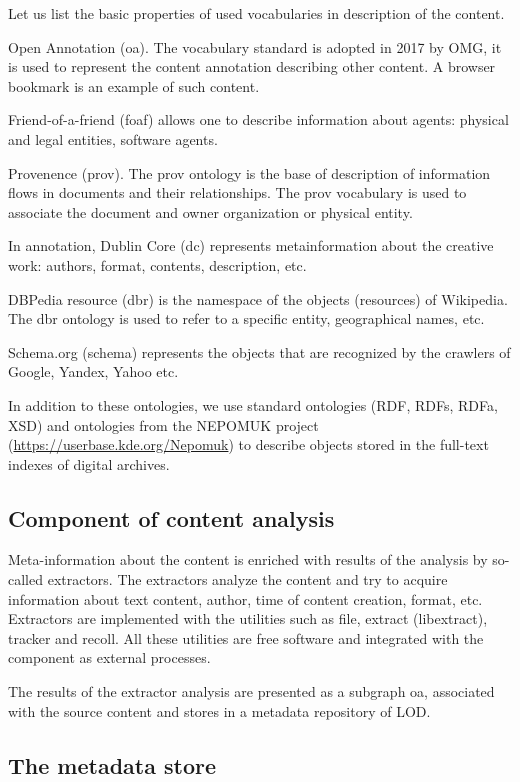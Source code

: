 \documentclass[12pt]{llncs}
\begin{document}
Let us list the basic properties of used vocabularies in description of
the content.

Open Annotation (oa). The vocabulary standard is adopted in 2017 by OMG, it is
used to represent the content annotation describing other content. A
browser bookmark is an example of such content.

Friend-of-a-friend (foaf) allows one to describe information about
agents: physical and legal entities, software agents.

Provenence (prov). The prov ontology is the base of description of
information flows in documents and their relationships. The prov
vocabulary is used to associate the document and owner organization or
physical entity.

In annotation, Dublin Core (dc) represents metainformation about the
creative work: authors, format, contents, description, etc.

DBPedia resource (dbr) is the namespace of the objects (resources) of
Wikipedia. The dbr ontology is used to refer to a specific entity,
geographical names, etc.

Schema.org (schema) represents the objects that are recognized by the
crawlers of Google, Yandex, Yahoo etc.

In addition to these ontologies, we use standard ontologies (RDF, RDFs,
RDFa, XSD) and ontologies from the NEPOMUK project
(\url{https://userbase.kde.org/Nepomuk}) to describe objects stored in the
full-text indexes of digital archives.

\subsection{Component of content analysis}

Meta-information about the content is enriched with results of the
analysis by so-called extractors. The extractors analyze the content and
try to acquire information about text content, author, time of content
creation, format, etc. Extractors are implemented with the utilities
such as file, extract (libextract), tracker and recoll. All these
utilities are free software and integrated with the component as
external processes.

The results of the extractor analysis are presented as a subgraph oa,
associated with the source content and stores in a metadata repository
of LOD.

\subsection{The metadata store}
\end{document}
